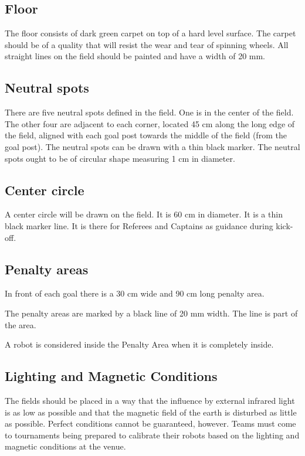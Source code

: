 \documentclass{article}
\begin{document}
\subsection{ Floor \label{ref-033}}

The floor consists of dark green carpet on top of a hard level surface. The
carpet should be of a quality that will resist the wear and tear of spinning
wheels. All straight lines on the field should be painted and have a width of
20 mm.

\subsection{ Neutral spots \label{ref-034}}

There are five neutral spots defined in the field. One is in the center of the
field. The other four are adjacent to each corner, located 45 cm along the long
edge of the field, aligned with each goal post towards the middle of the field
(from the goal post). The neutral spots can be drawn with a thin black marker.
The neutral spots ought to be of circular shape measuring 1 cm in diameter.

\subsection{ Center circle \label{ref-035}}

A center circle will be drawn on the field. It is 60 cm in diameter. It is a
thin black marker line. It is there for Referees and Captains as guidance
during kick-off.

\subsection{ Penalty areas \label{ref-036}}

In front of each goal there is a 30 cm wide and 90 cm long penalty area.

The penalty areas are marked by a black line of 20 mm width. The line is part
of the area.

A robot is considered inside the Penalty Area when it is completely inside.

\subsection{Lighting and Magnetic Conditions \label{ref-037}}

The fields should be placed in a way that the influence by external infrared
light is as low as possible and that the magnetic field of the earth is
disturbed as little as possible. Perfect conditions cannot be guaranteed,
however. Teams must come to tournaments being prepared to calibrate their
robots based on the lighting and magnetic conditions at the venue.
\end{document}
